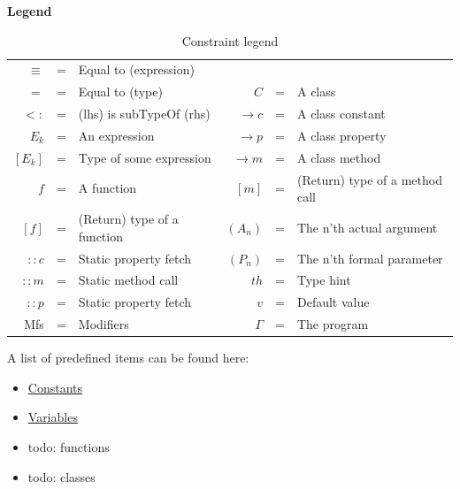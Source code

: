 \documentclass[../main.tex]{subfiles}
\begin{document}
    \textbf{Legend} \\
    \begin{table}[H]
        \begin{tabular}{ r c l | r c l }
            $\equiv$ & = & Equal to (expression) &
                 &  &  \\
            
            $=$     & = & Equal to (type) &
            $C$     & = & A class \\
            
            $<:$    & = & (lhs) is subTypeOf (rhs) &
            $\rightarrow c$     & = & A class constant \\
            
            $E_k$   & = & An expression &
            $\rightarrow p$     & = & A class property \\
            
            $[E_k]$ & = & Type of some expression &
            $\rightarrow m$     & = & A class method \\
            
            $f$     & = & A function &
            $[m]$   & = & (Return) type of a method call \\
            
            $[f]$   & = & (Return) type of a function &
            $(A_n)$ & = & The n'th actual argument \\
            
            $::c$   & = & Static property fetch &
            $(P_n)$ & = & The n'th formal parameter \\
            
            $::m$   & = & Static method call &
            $th$    & = & Type hint \\
            
            $::p$   & = & Static property fetch &
            $v$     & = & Default value \\
            
            Mfs     & = & Modifiers &
            $\Gamma$ & = & The program 
            
            
        \end{tabular}
        \caption{Constraint legend}
        \label{table:constraintLegend}
    \end{table}
    
    A list of predefined items can be found here:
    \begin{itemize}
        \item \href{Constants https://github.com/ruudvanderweijde/php-analysis/blob/master/src/lang/php/types/core/Constants.rsc}{Constants}
        \item \href{Constants https://github.com/ruudvanderweijde/php-analysis/blob/master/src/lang/php/types/core/Variables.rsc}{Variables}
        \item todo: functions
        \item todo: classes
    \end{itemize}
\end{document}
